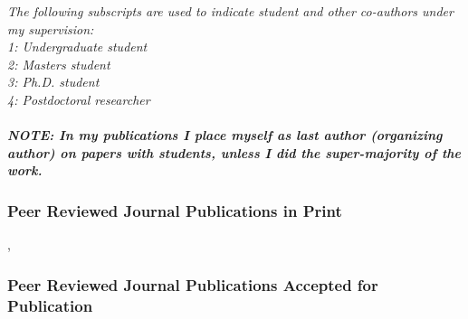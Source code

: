 

\emph{
  The following subscripts are used to indicate student and other co-authors
  under my supervision:\\
  1: Undergraduate student\\
  2:  Masters student\\
  3: Ph.D. student\\
  4: Postdoctoral researcher\\
  \\%
  \textbf{NOTE: In my publications I place myself as last author (organizing
    author) on
    papers with students, unless I did the super-majority of the work.}
}


\subsubsection{Peer Reviewed Journal Publications in Print}
\begin{journalbib}
\item {}, \pubaddendum[][impact: 4.292]
\end{journalbib}

\subsubsection{Peer Reviewed Journal Publications Accepted for Publication}

